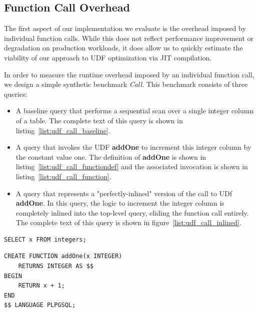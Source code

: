 \documentclass{vldb}
\newcommand{\dbCode}[1]{{\sffamily\small \textbf{#1}}\xspace}
\begin{document}
\subsection{Function Call Overhead}

The first aspect of our implementation we evaluate is the overhead imposed by individual function calls. While this does not reflect performance improvement or degradation on production workloads, it does allow us to quickly estimate the viability of our approach to UDF optimization via JIT compilation.

In order to measure the runtime overhead imposed by an individual function call, we design a simple synthetic benchmark \textit{Call}. This benchmark consists of three queries:

\begin{itemize}
    \item A baseline query that performs a sequential scan over a single integer column of a table. The complete text of this query is shown in listing~\ref{list:udf_call_baseline}. 
    \item A query that invokes the UDF \dbCode{addOne} to increment this integer column by the constant value one. The definition of \dbCode{addOne} is shown in listing~\ref{list:udf_call_functiondef} and the associated invocation is shown in listing~\ref{list:udf_call_function}.
    \item A query that represents a "perfectly-inlined" version of the call to UDf \dbCode{addOne}. In this query, the logic to increment the integer column is completely inlined into the top-level query, eliding the function call entirely. The complete text of this query is shown in figure~\ref{list:udf_call_inlined}.
\end{itemize}

\begin{listing}
    \begin{verbatim}
SELECT x FROM integers;
    \end{verbatim}
    \caption{The baseline query for evaluating the overhead of a UDF call.}
    \label{list:udf_call_baseline}
\end{listing}

\begin{listing}
    \begin{verbatim}
CREATE FUNCTION addOne(x INTEGER) 
    RETURNS INTEGER AS $$
BEGIN
    RETURN x + 1;
END
$$ LANGUAGE PLPGSQL;
    \end{verbatim}
    \caption{The definition of UDF \dbCode{addOne}.}
    \label{list:udf_call_functiondef}
\end{listing}
\end{document}
